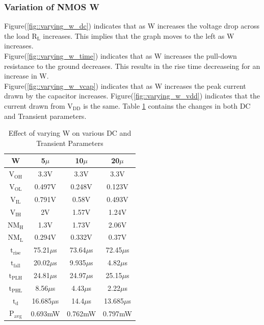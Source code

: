 \documentclass[12pt, a4paper]{article}
\begin{document}
	\subsubsection{Variation of NMOS W}
	Figure(\ref{fig::varying_w_dc}) indicates that as W increases the voltage drop across the load $\text{R}_\text{L}$ increases. This implies that the graph moves to the left as W increases.\\
	Figure(\ref{fig::varying_w_time}) indicates that as W increases the pull-down resistance to the ground decreases. This results in the rise time decreaseing for an increase in W.\\
	Figure(\ref{fig::varying_w_vcap}) indicates that as W increases the peak current drawn by the capacitor increases. Figure(\ref{fig::varying_w_vdd}) indicates that the current drawn from $\text{V}_{\text{DD}}$ is the same. Table \ref{table::tablevaryw} contains the changes in both DC and Transient parameters.
	\begin{table}[H]
		\begin{center}
			\begin{tabular}{|c|c|c|c|}
				\hline 
				\rule[-1ex]{0pt}{2.5ex} W & 5$\mu$ & 10$\mu$ & 20$\mu$  \\ 
				\hline 
				\rule[-1ex]{0pt}{2.5ex} $\text{V}_\text{OH}$ & 3.3V & 3.3V & 3.3V \\ 
				$\text{V}_\text{OL}$ & 0.497V & 0.248V & 0.123V \\ 
				$\text{V}_\text{IL}$ & 0.791V & 0.58V & 0.493V \\ 
				$\text{V}_\text{IH}$ & 2V & 1.57V & 1.24V \\ 
				$\text{NM}_\text{H}$ & 1.3V & 1.73V & 2.06V \\ 
				$\text{NM}_\text{L}$ & 0.294V & 0.332V & 0.37V \\ 
				$\text{t}_\text{rise}$ & 75.21$\mu$s & 73.64$\mu$s & 72.45$\mu$s \\ 
				$\text{t}_\text{fall}$ & 20.02$\mu$s & 9.935$\mu$s & 4.82$\mu$s \\ 
				$\text{t}_\text{PLH}$ & 24.81$\mu$s & 24.97$\mu$s & 25.15$\mu$s \\ 
				$\text{t}_\text{PHL}$ & 8.56$\mu$s & 4.43$\mu$s & 2.22$\mu$s \\ 
				$\text{t}_\text{d}$ & 16.685$\mu$s & 14.4$\mu$s & 13.685$\mu$s \\ 
				$\text{P}_\text{avg}$ & 0.693mW  & 0.762mW & 0.797mW \\ 
				\hline 
			\end{tabular} 
		\end{center}
		\caption{Effect of varying W on various DC and Transient Parameters}
		\label{table::tablevaryw}
	\end{table}
\end{document}
